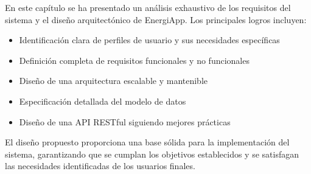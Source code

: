 En este capítulo se ha presentado un análisis exhaustivo de los requisitos del sistema y el diseño arquitectónico de EnergiApp. Los principales logros incluyen:

\begin{itemize}
    \item Identificación clara de perfiles de usuario y sus necesidades específicas
    \item Definición completa de requisitos funcionales y no funcionales
    \item Diseño de una arquitectura escalable y mantenible
    \item Especificación detallada del modelo de datos
    \item Diseño de una API RESTful siguiendo mejores prácticas
\end{itemize}

El diseño propuesto proporciona una base sólida para la implementación del sistema, garantizando que se cumplan los objetivos establecidos y se satisfagan las necesidades identificadas de los usuarios finales.
